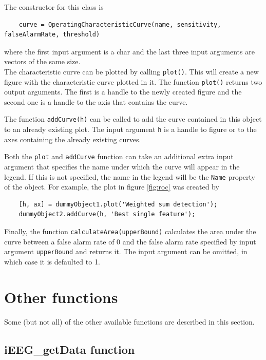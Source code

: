 \documentclass[usletter, 11pt]{extarticle}
\begin{document}
The constructor for this class is 
\begin{Verbatim}
	curve = OperatingCharacteristicCurve(name, sensitivity, falseAlarmRate, threshold)
\end{Verbatim}
where the first input argument is a char and the last three input arguments are vectors of the same size. \\

The characteristic curve can be plotted by calling \verb|plot()|. This will create a new figure with the characteristic curve plotted in it. The function \verb|plot()| returns two output arguments. The first is a handle to the newly created figure and the second one is a handle to the axis that contains the curve.

The function \verb|addCurve(h)| can be called to add the curve contained in this object to an already existing plot. The input argument \verb|h| is a handle to figure or to the axes containing the already existing curves. 

Both the \verb|plot| and \verb|addCurve| function can take an additional extra input argument that specifies the name under which the curve will appear in the legend. If this is not specified, the name in the legend will be the \verb|Name| property of the object. For example, the plot in figure \ref{fig:roc} was created by
\begin{Verbatim}
	[h, ax] = dummyObject1.plot('Weighted sum detection');
	dummyObject2.addCurve(h, 'Best single feature');	
\end{Verbatim}

Finally, the function \verb|calculateArea(upperBound)| calculates the area under the curve between a false alarm rate of 0 and the false alarm rate specified by input argument \verb|upperBound| and returns it. The input argument can be omitted, in which case it is defaulted to 1.


\newpage
\section{Other functions}

Some (but not all) of the other available functions are described in this section.

\subsection{iEEG\_getData function} \label{sec:ieeg_getdata}
\end{document}
